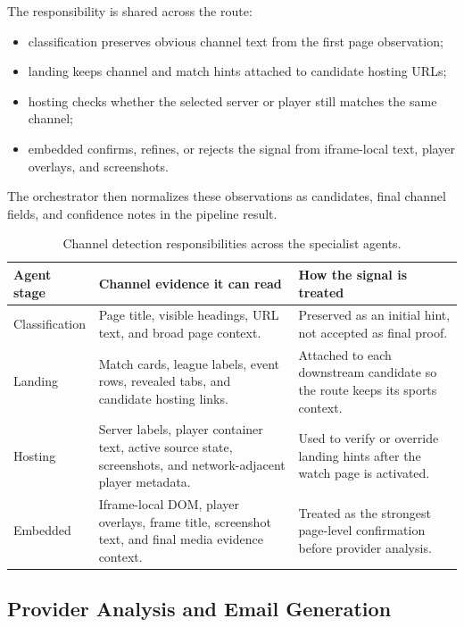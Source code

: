 The responsibility is shared across the route:
\begin{itemize}
  \item classification preserves obvious channel text from the first page observation;
  \item landing keeps channel and match hints attached to candidate hosting URLs;
  \item hosting checks whether the selected server or player still matches the same
  channel;
  \item embedded confirms, refines, or rejects the signal from iframe-local text,
  player overlays, and screenshots.
\end{itemize}

The orchestrator then normalizes these observations as candidates, final channel
fields, and confidence notes in the pipeline result.

\begin{table}[!htbp]
\centering
\begin{tabularx}{\textwidth}{Q{2.9cm} Y Y}
\toprule
{}
Agent stage & Channel evidence it can read & How the signal is treated \\
\midrule
Classification & Page title, visible headings, URL text, and broad page context.
& Preserved as an initial hint, not accepted as final proof. \\
Landing & Match cards, league labels, event rows, revealed tabs, and candidate
hosting links. & Attached to each downstream candidate so the route keeps its
sports context. \\
Hosting & Server labels, player container text, active source state, screenshots,
and network-adjacent player metadata. & Used to verify or override landing hints
after the watch page is activated. \\
Embedded & Iframe-local DOM, player overlays, frame title, screenshot text, and
final media evidence context. & Treated as the strongest page-level confirmation
before provider analysis. \\
\bottomrule
\end{tabularx}
\caption{Channel detection responsibilities across the specialist agents.}\label{tab:channel-detection-agents}
\end{table}

\FloatBarrier
\clearpage
\subsection{Provider Analysis and Email Generation}

